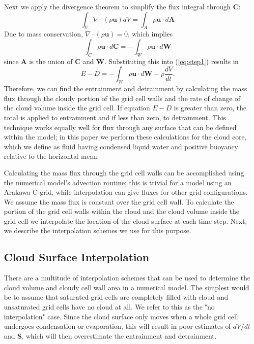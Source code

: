 \documentclass[12pt]{article}
\begin{document}
Next we apply the divergence theorem to simplify the flux integral through 
$\mathbf{C}$:
\begin{equation}
\label{eq:divergence} 
\int_{V} \nabla \cdot (\rho \mathbf{u}) dV = 
  \int_{A} \rho \mathbf{u}\cdot d\mathbf{A}
\end{equation}
Due to mass conservation, $\nabla \cdot (\rho \mathbf{u}) = 0$, which implies
\begin{equation}
\label{eq:divergence3} 
\int_{C} \rho \mathbf{u}\cdot d\mathbf{C} = - \int_{W} \rho \mathbf{u}\cdot d\mathbf{W}
\end{equation}
since $\mathbf{A}$ is the union of $\mathbf{C}$ and $\mathbf{W}$.  Substituting
this into (\ref{eq:step1}) results in
\begin{equation}
\label{eq:entrainment_detrainment} 
E - D = - \int_W \rho \mathbf{u} \cdot d\mathbf{W} - \rho \frac{dV}{dt}.
\end{equation}
Therefore, we can find the entrainment and detrainment by calculating the mass
flux through the cloudy portion of the grid cell walls and the rate of change
of the cloud volume inside the grid cell.  If equation $E - D$ is greater than 
zero, the total is applied to entrainment and if less than zero, to 
detrainment.  This technique works equally well for flux through any surface 
that can be defined within the model; in this paper we perform these 
calculations for the cloud core, which we define as fluid having condensed 
liquid water and positive buoyancy relative to the horizontal mean.  

Calculating the mass flux through the grid cell walls can be accomplished using 
the numerical model's advection routine; this is trivial for a model using an 
Arakawa C-grid, while interpolation can give fluxes for other grid 
configurations.  We assume the mass flux is constant over the grid cell wall.  
To calculate the portion of the grid cell walls within the cloud and the cloud 
volume inside the grid cell we interpolate the location of the cloud surface at 
each time step.  Next, we describe the interpolation schemes we use for this 
purpose.


\subsection{Cloud Surface Interpolation}

There are a multitude of interpolation schemes that can be used to determine 
the cloud volume and cloudy cell wall area in a numerical model.  The simplest 
would be to assume that saturated grid cells are completely filled with cloud 
and unsaturated grid cells have no cloud at all.  We refer to this as the "no 
interpolation" case.  Since the cloud surface only moves when a whole grid cell 
undergoes condensation or evaporation, this will result in poor estimates of 
$dV/dt$ and $\mathbf{S}$, which will then overestimate the entrainment and 
detrainment.
\end{document}
